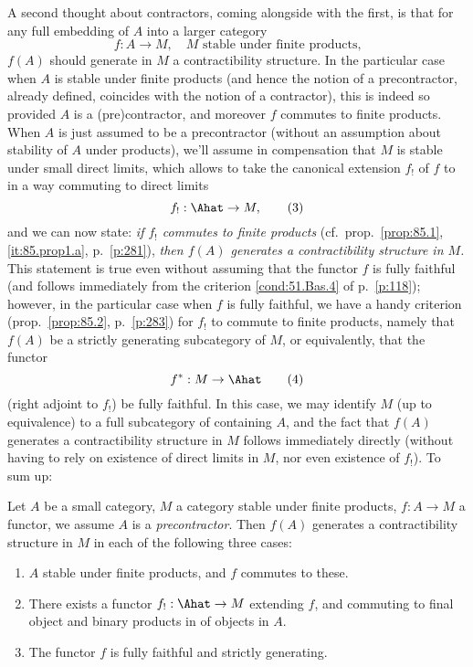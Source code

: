 A second thought about contractors, coming alongside with the first,
is that for any full embedding of $A$ into a larger category
\begin{equation}
  \label{eq:95.2}
  f:A\to M, \quad\text{$M$ stable under finite products,}\tag{2}
\end{equation}
$f(A)$ should generate in $M$ a contractibility structure. In the
particular case when $A$ is stable under finite products (and hence
the notion of a precontractor, already defined, coincides with the
notion of a contractor), this is indeed so provided $A$ is a
(pre)contractor, and moreover $f$ commutes to finite products. When
$A$ is just assumed to be a precontractor (without an assumption about
stability of $A$ under products), we'll assume in compensation that
$M$ is stable under small direct limits, which allows to take the
canonical extension $f_!$ of $f$ to \Ahat{} in a way commuting to
direct limits
\begin{equation}
  \label{eq:95.3}
  f_!:\Ahat\to M,\tag{3}
\end{equation}
and we can now state: \emph{if $f_!$ commutes to finite products}
(cf.\ prop.\ \ref{prop:85.1}, \ref{it:85.prop1.a}, p.\ \ref{p:281}),
\emph{then $f(A)$ generates a contractibility structure in $M$.} This
statement is true even without assuming that the functor $f$ is fully
faithful (and follows immediately from the criterion
\ref{cond:51.Bas.4} of p.\ \ref{p:118}); however, in the particular
case when $f$ is fully faithful, we have a handy criterion (prop.\
\ref{prop:85.2}, p.\ \ref{p:283}) for $f_!$ to commute to finite
products, namely that $f(A)$ be a strictly generating subcategory of
$M$, or equivalently, that the functor
\begin{equation}
  \label{eq:95.4}
  f^*:M\to\Ahat\tag{4}
\end{equation}
(right adjoint to $f_!$) be fully faithful. In this case, we may
identify $M$ (up to equivalence) to a full subcategory of \Ahat{}
containing $A$, and the fact that $f(A)$ generates a contractibility
structure in $M$ follows immediately directly (without having to rely
on existence of direct limits in $M$, nor even existence of $f_!$). To
sum up:
\begin{propositionnum}\label{prop:95.1}
  Let $A$ be a small category, $M$ a category stable under
  finite products, $f:A\to M$ a functor, we assume $A$ is a
  \emph{precontractor}. Then $f(A)$ generates a contractibility
  structure in $M$ in each of the following three cases:
  \begin{enumerate}[label=\alph*),font=\normalfont]
  \item\label{it:95.prop1.a}
    $A$ stable under finite products, and $f$ commutes to these.
  \item\label{it:95.prop1.b}
    There exists a functor $f_!:\Ahat\to M$ extending $f$, and
    commuting to final object and binary products in \Ahat{} of
    objects in $A$\kern1pt.
  \item\label{it:95.prop1.c}
    The functor $f$ is fully faithful and strictly generating.
  \end{enumerate}
\end{propositionnum}

